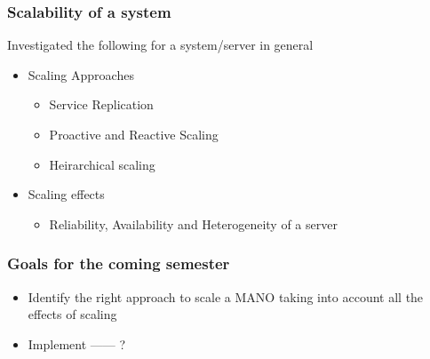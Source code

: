 \begin{frame}
\frametitle{Scalability of a system}
Investigated the following for a system/server in general
\begin{itemize}
	\item Scaling Approaches
			\begin{itemize}
				\item Service Replication
				\item Proactive and Reactive Scaling
				\item Heirarchical scaling
		\end{itemize}	
	\item Scaling effects
	\begin{itemize}
		\item Reliability, Availability and Heterogeneity of a server
		
	\end{itemize}
	
\end{itemize}

\end{frame}



\begin{frame}

\frametitle{Goals for the coming semester} 

\begin{itemize}
	\item Identify the right approach to scale a MANO taking into account all the effects of scaling
	
	\item Implement ------ ?
	
\end{itemize}


\end{frame}

